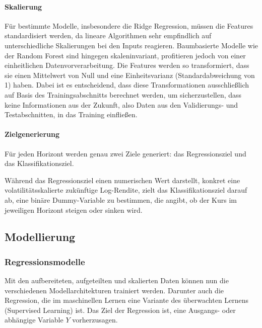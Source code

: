 \paragraph{Skalierung}
Für bestimmte Modelle, insbesondere die Ridge Regression, müssen die Features standardisiert werden, da lineare Algorithmen sehr empfindlich auf unterschiedliche Skalierungen bei den Inputs reagieren. Baumbasierte Modelle wie der Random Forest sind hingegen skaleninvariant, profitieren jedoch von einer einheitlichen Datenvorverarbeitung. Die Features werden so transformiert, dass sie einen Mittelwert von Null und eine Einheitsvarianz (Standardabweichung von 1) haben. \cite[S.~604]{tesl} Dabei ist es entscheidend, dass diese Transformationen ausschließlich auf Basis des Trainingsabschnitts berechnet werden, um sicherzustellen, dass keine Informationen aus der Zukunft, also Daten aus den Validierungs- und Testabschnitten, in das Training einfließen. \cite[S.~389]{mckinney_python_2018}

\paragraph{Zielgenerierung}
Für jeden Horizont werden genau zwei Ziele generiert: das Regressionsziel und das Klassifikationsziel.

Während das Regressionsziel einen numerischen Wert darstellt, konkret eine volatilitätsskalierte zukünftige Log-Rendite, zielt das Klassifikationsziel darauf ab, eine binäre Dummy-Variable zu bestimmen, die angibt, ob der Kurs im jeweiligen Horizont steigen oder sinken wird. \cite[S.~10]{tesl}

\subsection{Modellierung}
\subsubsection{Regressionsmodelle} \label{regression}
Mit den aufbereiteten, aufgeteilten und skalierten Daten können nun die verschiedenen Modellarchitekturen trainiert werden. Darunter auch die Regression, die im maschinellen Lernen eine Variante des überwachten Lernens (Supervised Learning) ist. Das Ziel der Regression ist, eine Ausgangs- oder abhängige Variable $Y$ vorherzusagen. \cite[S.~10]{tesl}

